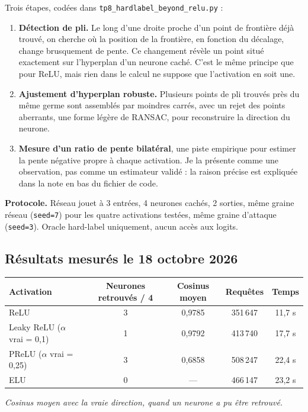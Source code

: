 \documentclass[11pt]{article}
\begin{document}
Trois étapes, codées dans \texttt{tp8\_hardlabel\_beyond\_relu.py} :

\begin{enumerate}
  \item \textbf{Détection de pli.} Le long d'une droite proche d'un point de frontière déjà trouvé, on cherche où la position de la frontière, en fonction du décalage, change brusquement de pente. Ce changement révèle un point situé exactement sur l'hyperplan d'un neurone caché. C'est le même principe que pour ReLU, mais rien dans le calcul ne suppose que l'activation en soit une.
  \item \textbf{Ajustement d'hyperplan robuste.} Plusieurs points de pli trouvés près du même germe sont assemblés par moindres carrés, avec un rejet des points aberrants, une forme légère de RANSAC, pour reconstruire la direction du neurone.
  \item \textbf{Mesure d'un ratio de pente bilatéral}, une piste empirique pour estimer la pente négative propre à chaque activation. Je la présente comme une observation, pas comme un estimateur validé : la raison précise est expliquée dans la note en bas du fichier de code.
\end{enumerate}

\textbf{Protocole.} Réseau jouet à 3 entrées, 4 neurones cachés, 2 sorties, même graine réseau (\texttt{seed=7}) pour les quatre activations testées, même graine d'attaque (\texttt{seed=3}). Oracle hard-label uniquement, aucun accès aux logits.

\subsection*{Résultats mesurés le 18 octobre 2026}

\begin{table}[h]
\centering
\small
\begin{tabular}{lcccc}
\toprule
Activation & Neurones retrouvés / 4 & Cosinus moyen & Requêtes & Temps \\
\midrule
ReLU & 3 & 0,9785 & 351\,647 & 11,7 s \\
Leaky ReLU ($\alpha$ vrai = 0,1) & 1 & 0,9792 & 413\,740 & 17,7 s \\
PReLU ($\alpha$ vrai = 0,25) & 3 & 0,6858 & 508\,247 & 22,4 s \\
ELU & 0 & --- & 466\,147 & 23,2 s \\
\bottomrule
\end{tabular}
\end{table}
\par\noindent\small\textit{Cosinus moyen avec la vraie direction, quand un neurone a pu être retrouvé.}\normalsize\par
\end{document}
